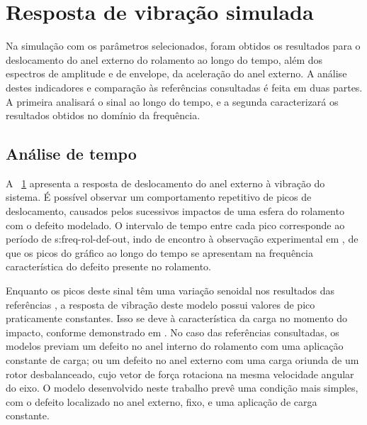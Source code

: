 \documentclass[12pt,oneside,english,brazil,lmodern,siglas,simbolos,cite=num]{ucsmonograph}
\begin{document}
	\section{Resposta de vibração simulada}
	Na simulação com os parâmetros selecionados, foram obtidos os resultados para o deslocamento do anel externo do rolamento ao longo do tempo, além dos espectros de amplitude e de envelope, da aceleração do anel externo.
	A análise destes indicadores e comparação às referências consultadas é feita em duas partes.
	A primeira analisará o sinal ao longo do tempo, e a segunda caracterizará os resultados obtidos no domínio da frequência.
	
	\subsection{Análise de tempo} \label{sec:res:analise-tempo}
	A \figurename\ \ref{fig:modelo-ext-tempo} apresenta a resposta de deslocamento do anel externo à vibração do sistema.
	É possível observar um comportamento repetitivo de picos de deslocamento, causados pelos sucessivos impactos de uma esfera do rolamento com o defeito modelado.
	O intervalo de tempo entre cada pico corresponde ao período de \gls{s:freq-rol-def-out}, indo de encontro à observação experimental em \cite{cong:2013}, de que os picos do gráfico ao longo do tempo se apresentam na frequência característica do defeito presente no rolamento.
	
	\begin{figure}[b]
		\label{fig:modelo-ext-tempo}
	\end{figure}
	
	Enquanto os picos deste sinal têm uma variação senoidal nos resultados das referências \cite{mcfadden:1984,sassi:2007,cong:2013,patil:2010}, a resposta de vibração deste modelo possui valores de pico praticamente constantes.
	Isso se deve à característica da carga no momento do impacto, conforme demonstrado em \cite{mcfadden:1984,cong:2013}.
	No caso das referências consultadas, os modelos previam um defeito no anel interno do rolamento com uma aplicação constante de carga; ou um defeito no anel externo com uma carga oriunda de um rotor desbalanceado, cujo vetor de força rotaciona na mesma velocidade angular do eixo.
	O modelo desenvolvido neste trabalho prevê uma condição mais simples, com o defeito localizado no anel externo, fixo, e uma aplicação de carga constante.
	
\end{document}
